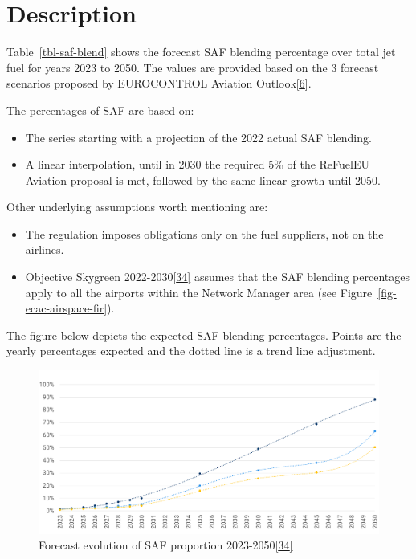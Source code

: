 \documentclass[
  11pt,
  a4paper,
]{book}
\providecommand{\tightlist}{%
  \setlength{\itemsep}{0pt}\setlength{\parskip}{0pt}}\usepackage{longtable,booktabs,array}
\begin{document}
\hypertarget{description-2}{%
\section{Description}\label{description-2}}

Table~\ref{tbl-saf-blend} shows the forecast SAF blending percentage
over total jet fuel for years 2023 to 2050. The values are provided
based on the 3 forecast scenarios proposed by EUROCONTROL Aviation
Outlook\protect\hyperlink{ref-aviation:outlook2022}{{[}6{]}}.

The percentages of SAF are based on:

\begin{itemize}
\tightlist
\item
  The series starting with a projection of the 2022 actual SAF blending.
\item
  A linear interpolation, until in 2030 the required 5\% of the ReFuelEU
  Aviation proposal is met, followed by the same linear growth until
  2050.
\end{itemize}

Other underlying assumptions worth mentioning are:

\begin{itemize}
\tightlist
\item
  The regulation imposes obligations only on the fuel suppliers, not on
  the airlines.
\item
  Objective Skygreen
  2022-2030\protect\hyperlink{ref-skygreen2022}{{[}34{]}} assumes that
  the SAF blending percentages apply to all the airports within the
  Network Manager area (see Figure~\ref{fig-ecac-airspace-fir}).
\end{itemize}

The figure below depicts the expected SAF blending percentages. Points
are the yearly percentages expected and the dotted line is a trend line
adjustment.

\begin{figure}

{\centering \includegraphics{chapters/../figures/saf_blend.png}

}

\caption{\label{fig-saf-blend}Forecast evolution of SAF proportion
2023-2050\protect\hyperlink{ref-skygreen2022}{{[}34{]}}}

\end{figure}
\end{document}
